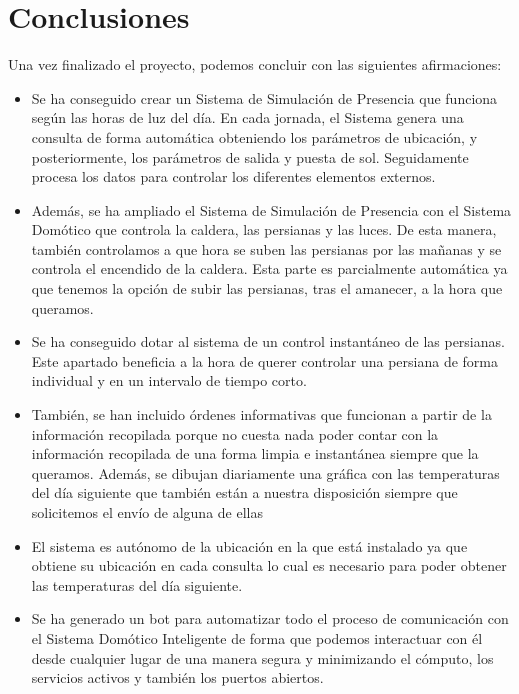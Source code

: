 \section{Conclusiones}
Una vez finalizado el proyecto, podemos concluir con las siguientes afirmaciones:
\begin{itemize}
\item Se ha conseguido crear un Sistema de Simulación de Presencia que funciona según las horas de luz del día. En cada jornada, el Sistema genera una consulta de forma automática obteniendo los parámetros de ubicación, y posteriormente, los parámetros de salida y puesta de sol. Seguidamente procesa los datos para controlar los diferentes elementos externos.

\item Además, se ha ampliado el Sistema de Simulación de Presencia con el Sistema Domótico que controla la caldera, las persianas y las luces. De esta manera, también controlamos a que hora se suben las persianas por las mañanas y se controla el encendido de la caldera. Esta parte es parcialmente automática ya que tenemos la opción de subir las persianas, tras el amanecer, a la hora que queramos.

\item Se ha conseguido dotar al sistema de un control instantáneo de las persianas. Este apartado beneficia a la hora de querer controlar una persiana de forma individual y en un intervalo de tiempo corto.

\item También, se han incluido órdenes informativas que funcionan a partir de la información recopilada porque no cuesta nada poder contar con la información recopilada de una forma limpia e instantánea siempre que la queramos. Además, se dibujan diariamente una gráfica con las temperaturas del día siguiente que también están a nuestra disposición siempre que solicitemos el envío de alguna de ellas

\item El sistema es autónomo de la ubicación en la que está instalado ya que obtiene su ubicación en cada consulta lo cual es necesario para poder obtener las temperaturas del día siguiente.

\item Se ha generado un bot para automatizar todo el proceso de comunicación con el Sistema Domótico Inteligente de forma que podemos interactuar con él desde cualquier lugar de una manera segura y minimizando el cómputo, los servicios activos y también los puertos abiertos.


\end{itemize}
